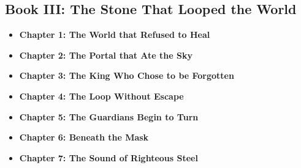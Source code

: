 \documentclass[12pt]{article}
\begin{document}
\begin{titlepage}
\subsection*{Book III: The Stone That Looped the World}
\begin{itemize}
  \item \textbf{Chapter 1: The World that Refused to Heal}
  \item \textbf{Chapter 2: The Portal that Ate the Sky}
  \item \textbf{Chapter 3: The King Who Chose to be Forgotten}
  \item \textbf{Chapter 4: The Loop Without Escape}
  \item \textbf{Chapter 5: The Guardians Begin to Turn}
  \item \textbf{Chapter 6: Beneath the Mask}
  \item \textbf{Chapter 7: The Sound of Righteous Steel}
\end{itemize}
\end{titlepage}


\newpage
\end{document}
